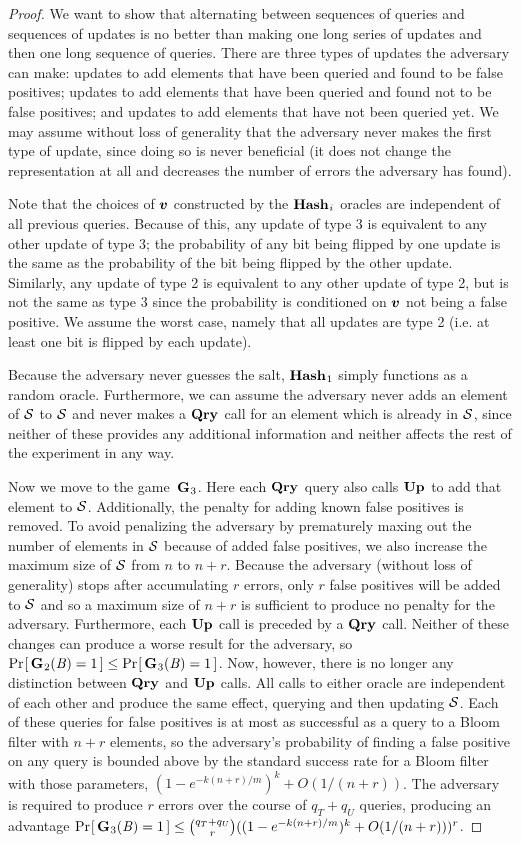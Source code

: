 \begin{proof}
We want to show that alternating between sequences of queries and sequences of updates is no better than making one long series of updates and then one long sequence of queries. There are three types of updates the adversary can make: updates to add elements that have been queried and found to be false positives; updates to add elements that have been queried and found not to be false positives; and updates to add elements that have not been queried yet. We may assume without loss of generality that the adversary never makes the first type of update, since doing so is never beneficial (it does not change the representation at all and decreases the number of errors the adversary has found).

Note that the choices of $\vv$ constructed by the $\mathbf{Hash}\hspace{0.5pt}_i$ oracles are independent of all previous queries. Because of this, any update of type 3 is equivalent to any other update of type 3; the probability of any bit being flipped by one update is the same as the probability of the bit being flipped by the other update. Similarly, any update of type 2 is equivalent to any other update of type 2, but is not the same as type 3 since the probability is conditioned on $\vv$ not being a false positive. We assume the worst case, namely that all updates are type 2 (i.e. at least one bit is flipped by each update).

Because the adversary never guesses the salt, $\mathbf{Hash}\hspace{0.5pt}_1$ simply functions as a random oracle. Furthermore, we can assume the adversary never adds an element of $\mathcal{S}$ to $\mathcal{S}$ and never makes a $\mathbf{Qry}\hspace{0.5pt}$ call for an element which is already in $\mathcal{S}$, since neither of these provides any additional information and neither affects the rest of the experiment in any way.

Now we move to the game~$\mathbf{G}\hspace{0.5pt}_3$. Here each $\mathbf{Qry}\hspace{0.5pt}$ query also calls $\mathbf{Up}\hspace{0.5pt}$ to add that element to $\mathcal{S}$. Additionally, the penalty for adding known false positives is removed. To avoid penalizing the adversary by prematurely maxing out the number of elements in $\mathcal{S}$ because of added false positives, we also increase the maximum size of $\mathcal{S}$ from $n$ to $n+r$. Because the adversary (without loss of generality) stops after accumulating $r$ errors, only $r$ false positives will be added to $\mathcal{S}$ and so a maximum size of $n+r$ is sufficient to produce no penalty for the adversary. Furthermore, each $\mathbf{Up}\hspace{0.5pt}$ call is preceded by a $\mathbf{Qry}\hspace{0.5pt}$ call. Neither of these changes can produce a worse result for the adversary, so $\Pr\hspace{-1pt}\left[\,\mathbf{G}\hspace{0.5pt}_2(\mathit{B}) = 1\,\right] \le \Pr\hspace{-1pt}\left[\,\mathbf{G}\hspace{0.5pt}_3(\mathit{B}) = 1\,\right]$. Now, however, there is no longer any distinction between $\mathbf{Qry}\hspace{0.5pt}$ and $\mathbf{Up}\hspace{0.5pt}$ calls. All calls to either oracle are independent of each other and produce the same effect, querying and then updating $\mathcal{S}$. Each of these queries for false positives is at most as successful as a query to a Bloom filter with $n+r$ elements, so the adversary's probability of finding a false positive on any query is bounded above by the standard success rate for a Bloom filter with those parameters, $(1-e^{-k(n+r)/m})^k+O(1/(n+r))$. The adversary is required to produce $r$ errors over the course of $q_T+q_U$ queries, producing an advantage $\Pr\hspace{-1pt}\left[\,\mathbf{G}\hspace{0.5pt}_3(\mathit{B}) = 1\,\right] \le \binom{q_T+q_U}{r}((1-e^{-k(n+r)/m})^k+O(1/(n+r)))^r$.


\end{proof}
